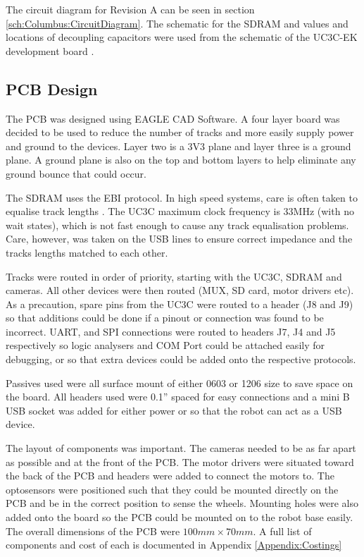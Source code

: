 The circuit diagram for Revision A can be seen in section \ref{sch:Columbus:CircuitDiagram}. The schematic for the SDRAM and values and locations of decoupling capacitors were used from the schematic of the UC3C-EK development board \citep{Atmel:UC3CEK}. 
\subsection{PCB Design}
The PCB was designed using EAGLE CAD Software. A four layer board was decided to be used to reduce the number of tracks and more easily supply power and ground to the devices. Layer two is a 3V3 plane and layer three is a ground plane. A ground plane is also on the top and bottom layers to help eliminate any ground bounce that could occur. 

The SDRAM uses the EBI protocol. In high speed systems, care is often taken to equalise track lengths \citep{liu2004equalization}. The UC3C maximum clock frequency is 33MHz (with no wait states), which is not fast enough to cause any track equalisation problems. Care, however, was taken on the USB lines to ensure correct impedance and the tracks lengths matched to each other.

Tracks were routed in order of priority, starting with the UC3C, SDRAM and cameras. All other devices were then routed (\itc MUX, SD card, motor drivers etc). As a precaution, spare pins from the UC3C were routed to a header (J8 and J9) so that additions could be done if a pinout or connection was found to be incorrect. UART, \itc and SPI connections were routed to headers J7, J4 and J5 respectively so logic analysers and COM Port could be attached easily for debugging, or so that extra devices could be added onto the respective protocols. 

Passives used were all surface mount of either 0603 or 1206 size to save space on the board. All headers used were 0.1'' spaced for easy connections and a mini B USB socket was added for either power or so that the robot can act as a USB device. 

The layout of components was important. The cameras needed to be as far apart as possible and at the front of the PCB. The motor drivers were situated toward the back of the PCB and headers were added to connect the motors to. The optosensors were positioned such that they could be mounted directly on the PCB and be in the correct position to sense the wheels. Mounting holes were also added onto the board so the PCB could be mounted on to the robot base easily. The overall dimensions of the PCB were $100mm \times 70mm$. A full list of components and cost of each is documented in Appendix \ref{Appendix:Costings}


